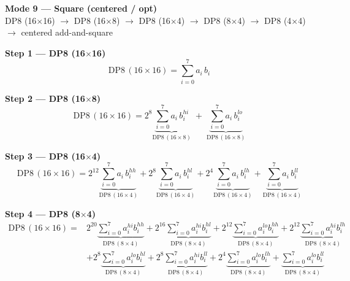 \documentclass[fleqn]{article}
\newcommand{\DPop}[3]{\mathrm{DP#1}\,(#2\!\times\!#3)}
\begin{document}
\begin{center}
{\LARGE \textbf{Mode 9 --- Square (centered / opt)}}\\[4pt]
{\large DP8 (16$\times$16) $\rightarrow$ DP8 (16$\times$8) $\rightarrow$ DP8 (16$\times$4) $\rightarrow$ DP8 (8$\times$4) $\rightarrow$ DP8 (4$\times$4) $\rightarrow$ centered add-and-square}
\end{center}

\vspace{0.1em}

\textbf{Step 1 --- DP8 (16$\times$16)}
\[
\DPop{8}{16}{16} = \sum_{i=0}^{7} a_i \, b_i
\]

\textbf{Step 2 --- DP8 (16$\times$8)}
\[
\DPop{8}{16}{16}
  = 2^{8} \underbrace{\sum_{i=0}^{7} a_i \, b_i^{hi}}_{\DPop{8}{16}{8}}
  \; + \; \underbrace{\sum_{i=0}^{7} a_i \, b_i^{lo}}_{\DPop{8}{16}{8}}
\]

\textbf{Step 3 --- DP8 (16$\times$4)}
\[
\DPop{8}{16}{16}
  = 2^{12} \underbrace{\sum_{i=0}^{7} a_i \, b_i^{hh}}_{\DPop{8}{16}{4}}
  + 2^{8} \underbrace{\sum_{i=0}^{7} a_i \, b_i^{hl}}_{\DPop{8}{16}{4}}
  + 2^{4} \underbrace{\sum_{i=0}^{7} a_i \, b_i^{lh}}_{\DPop{8}{16}{4}}
  + \underbrace{\sum_{i=0}^{7} a_i \, b_i^{ll}}_{\DPop{8}{16}{4}}
\]

\textbf{Step 4 --- DP8 (8$\times$4)}
\begin{align*}
\DPop{8}{16}{16} = {}
  & 2^{20} \underbrace{\sum_{i=0}^{7} a_i^{hi} b_i^{hh}}_{\DPop{8}{8}{4}}
  + 2^{16} \underbrace{\sum_{i=0}^{7} a_i^{hi} b_i^{hl}}_{\DPop{8}{8}{4}}
  + 2^{12} \underbrace{\sum_{i=0}^{7} a_i^{lo} b_i^{hh}}_{\DPop{8}{8}{4}}
  + 2^{12} \underbrace{\sum_{i=0}^{7} a_i^{hi} b_i^{lh}}_{\DPop{8}{8}{4}} \\[1em]
  & + 2^{8} \underbrace{\sum_{i=0}^{7} a_i^{lo} b_i^{hl}}_{\DPop{8}{8}{4}}
  + 2^{8} \underbrace{\sum_{i=0}^{7} a_i^{hi} b_i^{ll}}_{\DPop{8}{8}{4}}
  + 2^{4} \underbrace{\sum_{i=0}^{7} a_i^{lo} b_i^{lh}}_{\DPop{8}{8}{4}}
  + \underbrace{\sum_{i=0}^{7} a_i^{lo} b_i^{ll}}_{\DPop{8}{8}{4}}
\end{align*}
\end{document}
